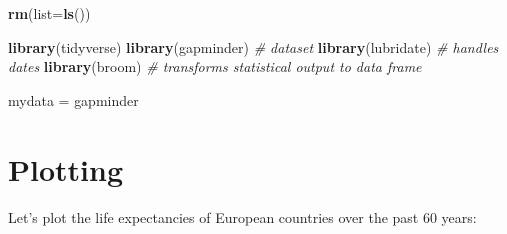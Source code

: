 \documentclass[]{book}
\makeatletter
\newenvironment{Shaded}{\begin{snugshade}}{\end{snugshade}}
\newcommand{\KeywordTok}[1]{\textcolor[rgb]{0.13,0.29,0.53}{\textbf{#1}}}
\newcommand{\DataTypeTok}[1]{\textcolor[rgb]{0.13,0.29,0.53}{#1}}
\newcommand{\DecValTok}[1]{\textcolor[rgb]{0.00,0.00,0.81}{#1}}
\newcommand{\StringTok}[1]{\textcolor[rgb]{0.31,0.60,0.02}{#1}}
\newcommand{\CommentTok}[1]{\textcolor[rgb]{0.56,0.35,0.01}{\textit{#1}}}
\newcommand{\OperatorTok}[1]{\textcolor[rgb]{0.81,0.36,0.00}{\textbf{#1}}}
\newcommand{\NormalTok}[1]{#1}
\newenvironment{kframe}{%
\medskip{}
\setlength{\fboxsep}{.8em}
 \def\at@end@of@kframe{}%
 \ifinner\ifhmode%
  \def\at@end@of@kframe{\end{minipage}}%
  \begin{minipage}{\columnwidth}%
 \fi\fi%
 \def\FrameCommand##1{\hskip\@totalleftmargin \hskip-\fboxsep
 \colorbox{shadecolor}{##1}\hskip-\fboxsep
     \hskip-\linewidth \hskip-\@totalleftmargin \hskip\columnwidth}%
 \MakeFramed {\advance\hsize-\width
   \@totalleftmargin\z@ \linewidth\hsize
   \@setminipage}}%
 {\par\unskip\endMakeFramed%
 \at@end@of@kframe}
\renewenvironment{Shaded}{\begin{kframe}}{\end{kframe}}
\makeatother
\begin{document}
\begin{Shaded}
\begin{Highlighting}[]
\KeywordTok{rm}\NormalTok{(}\DataTypeTok{list=}\KeywordTok{ls}\NormalTok{())}

\KeywordTok{library}\NormalTok{(tidyverse)}
\KeywordTok{library}\NormalTok{(gapminder) }\CommentTok{# dataset}
\KeywordTok{library}\NormalTok{(lubridate) }\CommentTok{# handles dates}
\KeywordTok{library}\NormalTok{(broom)     }\CommentTok{# transforms statistical output to data frame}

\NormalTok{mydata =}\StringTok{ }\NormalTok{gapminder}
\end{Highlighting}
\end{Shaded}

\section{Plotting}\label{plotting-3}

Let's plot the life expectancies of European countries over the past 60
years:

\begin{Shaded}
\end{Shaded}
\end{document}
